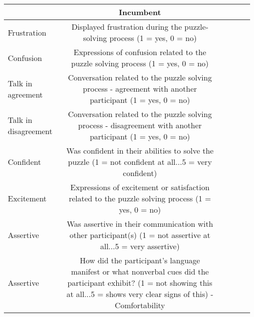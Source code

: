 \begin{tabular}{l*{5}{c}}
\toprule
                & Incumbent  \\
\midrule
Frustration          & Displayed frustration during the puzzle-solving process (1 = yes, 0 = no)     \\
Confusion            & Expressions of confusion related to the puzzle solving process (1 = yes, 0 = no) \\
Talk in agreement    & Conversation related to the puzzle solving process -	agreement with another participant (1 = yes, 0 = no)  \\
Talk in disagreement & Conversation related to the puzzle solving process -	disagreement with another participant (1 = yes, 0 = no) \\
Confident            & Was confident in their abilities to solve the puzzle (1 = not confident at all...5 = very confident)           \\
Excitement           & Expressions of excitement or satisfaction related to the puzzle solving process (1 = yes, 0 = no)             \\
Assertive            & Was assertive in their communication with other participant(s) (1 = not assertive at all...5 = very assertive) \\
Assertive            &     How did the participant's language manifest or what nonverbal cues did the participant exhibit? (1 = not showing this at all...5 = shows very clear signs of this) - Comfortability
            \\

\bottomrule
\end{tabular}


